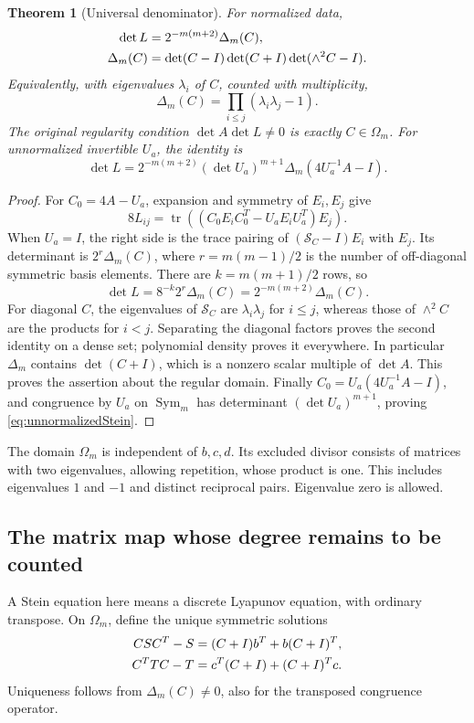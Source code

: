 \documentclass[11pt]{article}
\newtheorem{theorem}{Theorem}[section]
\theoremstyle{remark}\newtheorem{remark}[theorem]{Remark}
\DeclareMathOperator{\tr}{tr}
\DeclareMathOperator{\Sym}{Sym}
\begin{document}
\begin{theorem}[Universal denominator]\label{thm:stein-denom}
For normalized data,
\begin{align}\label{eq:stein-factor}
\det L&=2^{-m(m+2)}\Delta_m(C),\notag\\
\Delta_m(C)&=\det(C-I)\det(C+I)\det(\wedge^2 C-I).
\end{align}
Equivalently, with eigenvalues $\lambda_i$ of $C$, counted with multiplicity,
\[
\Delta_m(C)=\prod_{i\le j}(\lambda_i\lambda_j-1).
\]
The original regularity condition $\det A\det L\ne0$ is exactly $C\in\Omega_m$. For unnormalized invertible $U_a$, the identity is
\begin{equation}\label{eq:unnormalizedStein}
\det L=2^{-m(m+2)}(\det U_a)^{m+1}
\Delta_m(4U_a^{-1}A-I).
\end{equation}
\end{theorem}
\begin{proof}
For $C_0=4A-U_a$, expansion and symmetry of $E_i,E_j$ give
\[
8L_{ij}=\tr((C_0E_iC_0^T-U_aE_iU_a^T)E_j).
\]
When $U_a=I$, the right side is the trace pairing of $(\mathcal S_C-I)E_i$ with $E_j$. Its determinant is $2^r\Delta_m(C)$, where $r=m(m-1)/2$ is the number of off-diagonal symmetric basis elements. There are $k=m(m+1)/2$ rows, so
\[
\det L=8^{-k}2^r\Delta_m(C)=2^{-m(m+2)}\Delta_m(C).
\]
For diagonal $C$, the eigenvalues of $\mathcal S_C$ are $\lambda_i\lambda_j$ for $i\le j$, whereas those of $\wedge^2 C$ are the products for $i<j$. Separating the diagonal factors proves the second identity on a dense set; polynomial density proves it everywhere. In particular $\Delta_m$ contains $\det(C+I)$, which is a nonzero scalar multiple of $\det A$. This proves the assertion about the regular domain. Finally $C_0=U_a(4U_a^{-1}A-I)$, and congruence by $U_a$ on $\Sym_m$ has determinant $(\det U_a)^{m+1}$, proving \eqref{eq:unnormalizedStein}.
\end{proof}
The domain $\Omega_m$ is independent of $b,c,d$. Its excluded divisor consists of matrices with two eigenvalues, allowing repetition, whose product is one. This includes eigenvalues $1$ and $-1$ and distinct reciprocal pairs. Eigenvalue zero is allowed.

\subsection{The matrix map whose degree remains to be counted}
A Stein equation here means a discrete Lyapunov equation, with ordinary transpose. On $\Omega_m$, define the unique symmetric solutions
\begin{align}\label{eq:Stein}
CSC^T-S&=(C+I)b^T+b(C+I)^T,\notag\\
C^TTC-T&=c^T(C+I)+(C+I)^Tc.
\end{align}
Uniqueness follows from $\Delta_m(C)\ne0$, also for the transposed congruence operator.
\end{document}
